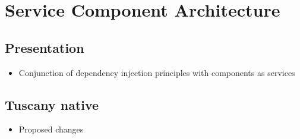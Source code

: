 \chapter{Service Component Architecture}

\section{Presentation}

\begin{itemize}
 \item Conjunction of dependency injection principles with components as services
\end{itemize}

\section{Tuscany native}

\begin{itemize}
 \item Proposed changes
\end{itemize}